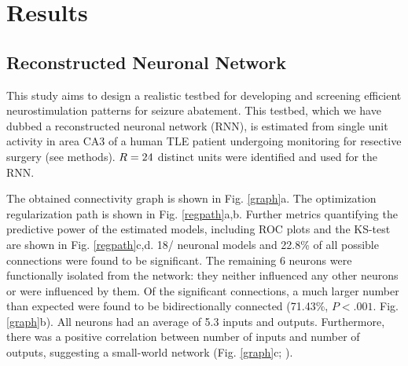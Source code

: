 \documentclass[11pt,a4paper,final]{article}
\begin{document}
\section{Results \label{results}}

    \subsection{Reconstructed Neuronal Network}

This study aims to design a realistic testbed for developing and screening efficient neurostimulation patterns for seizure abatement.
This testbed, which we have dubbed a reconstructed neuronal network (RNN), is estimated from single unit activity in area CA3 of a human TLE patient undergoing monitoring for resective surgery (see methods).
$R=24{}$ distinct units were identified and used for the RNN. 

The obtained connectivity graph is shown in Fig. \ref{graph}a.
The optimization regularization path is shown in Fig. \ref{regpath}a,b.
Further metrics quantifying the predictive power of the estimated models, including ROC plots and the KS-test are shown in Fig. \ref{regpath}c,d.
18/\nn{} neuronal models and 22.8\% of all possible connections were found to be significant.
The remaining 6 neurons were functionally isolated from the network: they neither influenced any other neurons or were influenced by them.
Of the significant connections, a much larger number than expected were found to be bidirectionally connected (71.43\%, $P<.001$. Fig. \ref{graph}b).
All neurons had an average of 5.3 inputs and outputs.
Furthermore, there was a positive correlation between number of inputs and number of outputs, suggesting a small-world network (Fig. \ref{graph}c; \citet{sporns09,fallani14}).
\end{document}
